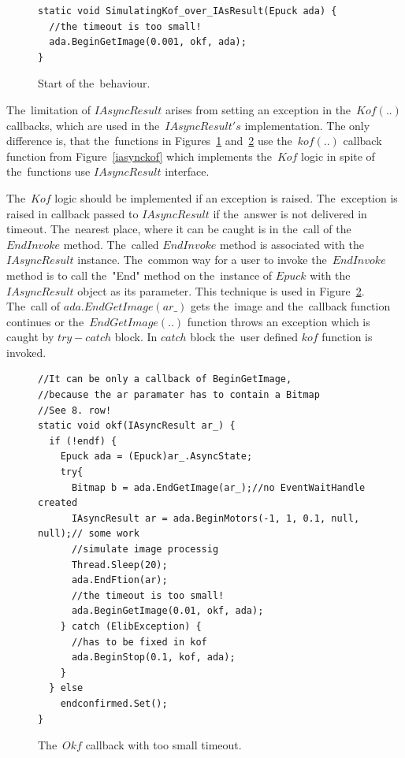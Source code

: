 \begin{figure}[!hbp]
\begin{lstlisting}
static void SimulatingKof_over_IAsResult(Epuck ada) {
  //the timeout is too small!
  ada.BeginGetImage(0.001, okf, ada);
}
\end{lstlisting}
\caption{Start of the~behaviour.}
\label{c:start}
\end{figure}

  The~limitation of $IAsyncResult$ arises from setting an exception in the~$Kof(..)$ callbacks,
  which are used in the~$IAsyncResult's$ implementation.
  The only difference is, that the~functions in Figures~\ref{c:start} 
  and~\ref{c:okfsim} use the~$kof(..)$ callback function
  from Figure~\ref{iasynckof} 
  which implements the~$Kof$ logic in spite of the~functions use $IAsyncResult$ interface.

  The~$Kof$ logic should be implemented if an exception is raised. 
  The~exception is raised in callback passed to $IAsyncResult$ if the~answer is not delivered in timeout. 
  The~nearest place, where it can be caught is in the~call of the~$EndInvoke$ method.
  The~called $EndInvoke$ method is associated with the~$IAsyncResult$ instance. 
  The~common way for a user to invoke the~$EndInvoke$ method is to call the~"End" method 
  on the~instance of $Epuck$ with the~$IAsyncResult$ object as its parameter. 
  This technique is used in Figure~\ref{c:okfsim}.
  The~call of $ada.EndGetImage(ar\_)$ gets the~image and the~callback function continues
  or the~$EndGetImage(..)$ function throws an exception which is caught by $try-catch$ block.
  In $catch$ block the~user defined $kof$ function is invoked.
  
\begin{figure}[!hbp]
\begin{lstlisting}
//It can be only a callback of BeginGetImage,
//because the ar paramater has to contain a Bitmap
//See 8. row!
static void okf(IAsyncResult ar_) {
  if (!endf) {
    Epuck ada = (Epuck)ar_.AsyncState;
    try{
      Bitmap b = ada.EndGetImage(ar_);//no EventWaitHandle created
      IAsyncResult ar = ada.BeginMotors(-1, 1, 0.1, null, null);// some work
      //simulate image processig
      Thread.Sleep(20);
      ada.EndFtion(ar);
      //the timeout is too small!
      ada.BeginGetImage(0.01, okf, ada);
    } catch (ElibException) {
      //has to be fixed in kof
      ada.BeginStop(0.1, kof, ada);
    }
  } else
    endconfirmed.Set();
}
\end{lstlisting}
\caption{The~$Okf$ callback with too small timeout.}
\label{c:okfsim}
\end{figure}

